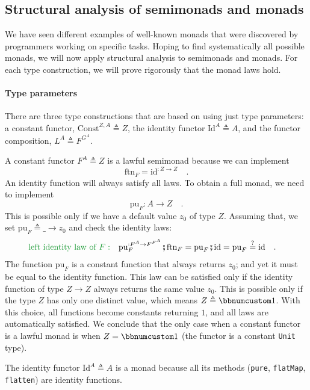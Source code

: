\subsection{Structural analysis of semimonads and monads}

We have seen different examples of well-known monads that were discovered
by programmers working on specific tasks. Hoping to find systematically
all possible monads, we will now apply structural analysis to semimonads
and monads. For each type construction, we will prove rigorously that
the monad laws hold.

\paragraph{Type parameters}

There are three type constructions that are based on using just type
parameters: a constant functor, $\text{Const}^{Z,A}\triangleq Z$,
the identity functor $\text{Id}^{A}\triangleq A$, and the functor
composition, $L^{A}\triangleq F^{G^{A}}$.

A constant functor $F^{A}\triangleq Z$ is a lawful semimonad because
we can implement
\[
\text{ftn}_{F}=\text{id}^{:Z\rightarrow Z}\quad.
\]
An identity function will always satisfy all laws. To obtain a full
monad, we need to implement
\[
\text{pu}_{F}:A\rightarrow Z\quad.
\]
This is possible only if we have a default value $z_{0}$ of type
$Z$. Assuming that, we set $\text{pu}_{F}\triangleq\_\rightarrow z_{0}$
and check the identity laws:
\begin{align*}
{\color{greenunder}\text{left identity law of }F:}\quad & \text{pu}_{F}^{:F^{A}\rightarrow F^{F^{A}}}\bef\text{ftn}_{F}=\text{pu}_{F}\bef\text{id}=\text{pu}_{F}\overset{?}{=}\text{id}\quad.
\end{align*}
The function $\text{pu}_{F}$ is a constant function that always returns
$z_{0}$; and yet it must be equal to the identity function. This
law can be satisfied only if the identity function of type $Z\rightarrow Z$
always returns the same value $z_{0}$. This is possible only if the
type $Z$ has only one distinct value, which means $Z\triangleq\bbnum 1$.
With this choice, all functions become constants returning $1$, and
all laws are automatically satisfied. We conclude that the only case
when a constant functor is a lawful monad is when $Z=\bbnum 1$ (the
functor is a constant \lstinline!Unit! type).

The identity functor $\text{Id}^{A}\triangleq A$ is a monad because
all its methods (\lstinline!pure!, \lstinline!flatMap!, \lstinline!flatten!)
are identity functions.

